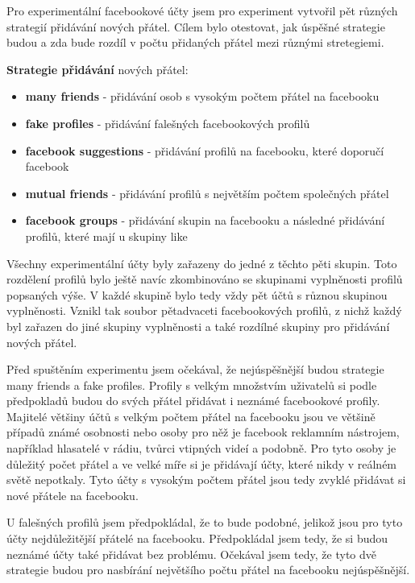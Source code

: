 \documentclass[thesis=M,czech]{FITthesis}[2013/05/10]
\begin{document}
Pro experimentální facebookové účty jsem pro experiment vytvořil pět různých strategií přidávání nových přátel. Cílem bylo otestovat, jak úspěšné strategie budou a zda bude rozdíl v počtu přidaných přátel mezi různými stretegiemi. 

\textbf{Strategie přidávání} nových přátel:

\begin{itemize}
  \item \textbf{many friends} - přidávání osob s vysokým počtem přátel na facebooku
  \item \textbf{fake profiles} - přidávání falešných facebookových profilů
  \item \textbf{facebook suggestions} - přidávání profilů na facebooku, které doporučí facebook 
  \item \textbf{mutual friends} - přidávání profilů s největším počtem společných přátel
  \item \textbf{facebook groups} - přidávání skupin na facebooku a následné přidávání profilů, které mají u skupiny like
\end{itemize}

Všechny experimentální účty byly zařazeny do jedné z těchto pěti skupin. Toto rozdělení profilů bylo ještě navíc zkombinováno se skupinami vyplněnosti profilů popsaných výše. V každé skupině bylo tedy vždy pět účtů s různou skupinou vyplněnosti. Vznikl tak soubor pětadvaceti facebookových profilů, z nichž každý byl zařazen do jiné skupiny vyplněnosti a také rozdílné skupiny pro přidávání nových přátel.

Před spuštěním experimentu jsem očekával, že nejúspěšnější budou strategie many friends a fake profiles. Profily s velkým množstvím uživatelů si podle předpokladů budou do svých přátel přidávat i neznámé facebookové profily. Majitelé většiny účtů s velkým počtem přátel na facebooku jsou ve většině případů známé osobnosti nebo osoby pro něž je facebook reklamním nástrojem, například hlasatelé v rádiu, tvůrci vtipných videí a podobně. Pro tyto osoby je důležitý počet přátel a ve velké míře si je přidávají účty, které nikdy v reálném světě nepotkaly. Tyto účty s vysokým počtem přátel jsou tedy zvyklé přidávat si nové přátele na facebooku.

U falešných profilů jsem předpokládal, že to bude podobné, jelikož jsou pro tyto účty nejdůležitější přátelé na facebooku. Předpokládal jsem tedy, že si budou neznámé účty také přidávat bez problému. Očekával jsem tedy, že tyto dvě strategie budou pro nasbírání největšího počtu přátel na facebooku nejúspěšnější.
\end{document}

